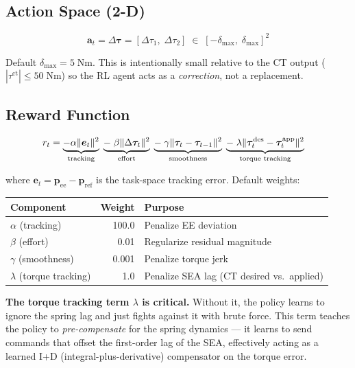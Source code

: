 \documentclass[11pt, a4paper]{article}
\newcommand{\bp}{\bm{p}}
\newcommand{\btau}{\bm{\tau}}
\begin{document}
\subsection{Action Space (2-D)}

\[
  \bm{a}_t = \Delta\btau = [\Delta\tau_1,\; \Delta\tau_2]
  \;\in\; [-\delta_{\max},\; \delta_{\max}]^2
\]

Default $\delta_{\max} = 5\;\text{Nm}$.  This is intentionally small
relative to the CT output ($|\tau^{\text{ct}}| \leq 50\;\text{Nm}$) so
the RL agent acts as a \emph{correction}, not a replacement.

\subsection{Reward Function}

\begin{align}
  r_t &= \underbrace{-\alpha \|\bm{e}_t\|^2}_{%
    \text{tracking}} \;
    \underbrace{-\;\beta \|\Delta\btau_t\|^2}_{%
    \text{effort}} \;
    \underbrace{-\;\gamma \|\btau_t - \btau_{t-1}\|^2}_{%
    \text{smoothness}} \;
    \underbrace{-\;\lambda \|\btau^{\text{des}}_t - \btau^{\text{app}}_t\|^2}_{%
    \text{torque tracking}}
  \label{eq:reward}
\end{align}

where $\bm{e}_t = \bp_{\text{ee}} - \bp_{\text{ref}}$ is the task-space
tracking error.  Default weights:

\begin{center}
\begin{tabular}{lrl}
\toprule
\textbf{Component} & \textbf{Weight} & \textbf{Purpose} \\
\midrule
$\alpha$ (tracking)        & 100.0   & Penalize EE deviation \\
$\beta$ (effort)           & 0.01    & Regularize residual magnitude \\
$\gamma$ (smoothness)      & 0.001   & Penalize torque jerk \\
$\lambda$ (torque tracking) & 1.0     & Penalize SEA lag (CT desired vs.~applied) \\
\bottomrule
\end{tabular}
\end{center}

\begin{mdframed}
\textbf{The torque tracking term $\lambda$ is critical.}\;
Without it, the policy learns to ignore the spring lag and just fights
against it with brute force.  This term teaches the policy to \emph{pre-compensate}
for the spring dynamics --- it learns to send commands that offset the
first-order lag of the SEA, effectively acting as a learned I+D
(integral-plus-derivative) compensator on the torque error.
\end{mdframed}
\end{document}
